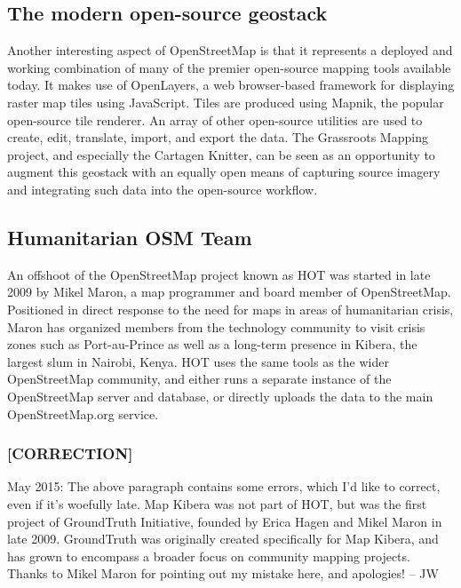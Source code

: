 \documentclass[11pt,oneside,notitlepage]{report}
\begin{document}
{{\subsection{The modern open-source geostack}

Another interesting aspect of OpenStreetMap is that it represents a deployed and working combination of many of the premier open-source mapping tools available today. It makes use of OpenLayers, a web browser-based framework for displaying raster map tiles using JavaScript. Tiles are produced using Mapnik, the popular open-source tile renderer. An array of other open-source utilities are used to create, edit, translate, import, and export the data. The Grassroots Mapping project, and especially the Cartagen Knitter, can be seen as an opportunity to augment this geostack with an equally open means of capturing source imagery and integrating such data into the open-source workflow. 

\subsection{Humanitarian OSM Team}
 
An offshoot of the OpenStreetMap project known as \ac{HOT} was started in late 2009 by Mikel Maron, a map programmer and board member of OpenStreetMap. Positioned in direct response to the need for maps in areas of humanitarian crisis, Maron has organized members from the technology community to visit crisis zones such as Port-au-Prince as well as a long-term presence in Kibera, the largest slum in Nairobi, Kenya. \ac{HOT} uses the same tools as the wider OpenStreetMap community, and either runs a separate instance of the OpenStreetMap server and database, or directly uploads the data to the main OpenStreetMap.org service. \cite{osm2010hot} 

\subsubsection{[CORRECTION]}

May 2015: The above paragraph contains some errors, which I'd like to correct, even if it's woefully late. Map Kibera was not part of \ac{HOT}, but was the first project of GroundTruth Initiative, founded by Erica Hagen and Mikel Maron in late 2009. GroundTruth was originally created specifically for Map Kibera, and has grown to encompass a broader focus on community mapping projects. Thanks to Mikel Maron for pointing out my mistake here, and apologies! -- JW 

}}
\end{document}
